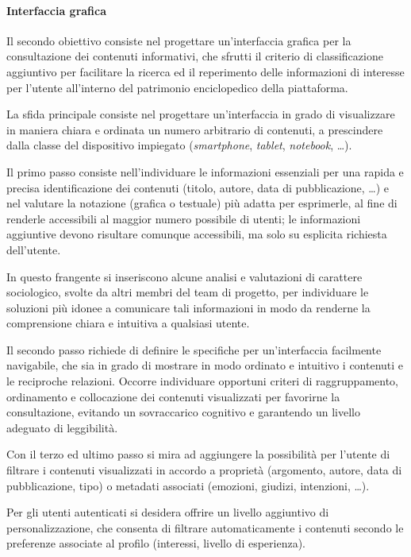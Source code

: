 \paragraph{Interfaccia grafica}
Il secondo obiettivo consiste nel progettare un'interfaccia grafica per la consultazione dei contenuti informativi, che sfrutti il criterio di classificazione aggiuntivo per facilitare la ricerca ed il reperimento delle informazioni di interesse per l'utente all'interno del patrimonio enciclopedico della piattaforma.

La sfida principale consiste nel progettare un'interfaccia in grado di visualizzare in maniera chiara e ordinata un numero arbitrario di contenuti, a prescindere dalla classe del dispositivo impiegato (\textit{smartphone}, \textit{tablet}, \textit{notebook}, \ldots).

Il primo passo consiste nell'individuare le informazioni essenziali per una rapida e precisa identificazione dei contenuti (titolo, autore, data di pubblicazione, \ldots) e nel valutare la notazione (grafica o testuale) più adatta per esprimerle, al fine di renderle accessibili al maggior numero possibile di utenti; le informazioni aggiuntive devono risultare comunque accessibili, ma solo su esplicita richiesta dell'utente.

In questo frangente si inseriscono alcune analisi e valutazioni di carattere sociologico, svolte da altri membri del team di progetto, per individuare le soluzioni più idonee a comunicare tali informazioni in modo da renderne la comprensione chiara e intuitiva a qualsiasi utente.

Il secondo passo richiede di definire le specifiche per un'interfaccia facilmente navigabile, che sia in grado di mostrare in modo ordinato e intuitivo i contenuti e le reciproche relazioni. Occorre individuare opportuni criteri di raggruppamento, ordinamento e collocazione dei contenuti visualizzati per favorirne la consultazione, evitando un sovraccarico cognitivo e garantendo un livello adeguato di leggibilità.

Con il terzo ed ultimo passo si mira ad aggiungere la possibilità per l'utente di filtrare i contenuti visualizzati in accordo a proprietà (argomento, autore, data di pubblicazione, tipo) o metadati associati (emozioni, giudizi, intenzioni, \ldots).

Per gli utenti autenticati si desidera offrire un livello aggiuntivo di personalizzazione, che consenta di filtrare automaticamente i contenuti secondo le preferenze associate al profilo (interessi, livello di esperienza).

